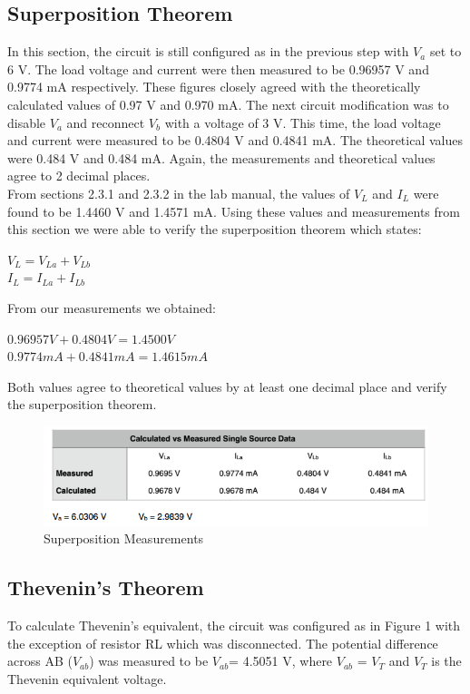 \documentclass[12pt]{article}
\begin{document}
\subsection{Superposition Theorem}
In this section, the circuit is still configured as in the previous step with $V_{a}$ set to 6 V. The load voltage and current were then measured to be 0.96957 V and 0.9774 mA respectively. These figures closely agreed with the theoretically calculated values of 0.97 V and 0.970 mA. The next circuit modification was to disable $V_{a}$ and reconnect $V_{b}$ with a voltage of 3 V. This time, the load voltage and current were measured to be 0.4804 V and 0.4841 mA. The theoretical values were 0.484 V and 0.484 mA. Again, the measurements and theoretical values agree to 2 decimal places.\\
From sections 2.3.1 and 2.3.2 in the lab manual, the values of $V_{L}$ and $I_{L}$ were found to be 1.4460 V and 1.4571 mA. Using these values and measurements from this section we were able to verify the superposition theorem which states:
\begin{center}
	$V_{L} = V_{La}+V_{Lb}$\\
	$I_{L} = I_{La}+I_{Lb}$
\end{center}
From our measurements we obtained:
\begin{center}
$0.96957 V + 0.4804 V = 1.4500 V$\\
$0.9774 mA + 0.4841 mA = 1.4615 mA$	
\end{center}
Both values agree to theoretical values by at least one decimal place and verify the superposition theorem.
\begin{figure}[htbp]
	\centering
	\includegraphics[scale=1]{SuperpositionMeasurement.png}
	\caption{Superposition Measurements}
	\label{fig.superMeasure}
\end{figure}
\pagebreak
\subsection{Thevenin's Theorem}
To calculate Thevenin’s equivalent, the circuit was configured as in Figure 1 with the exception of resistor RL which was disconnected. The potential difference across AB ($V_{ab}$) was measured to be $V_{ab}$= 4.5051 V, where $V_{ab}$ = $V_{T}$ and $V_{T}$ is the Thevenin equivalent voltage.
\end{document}
